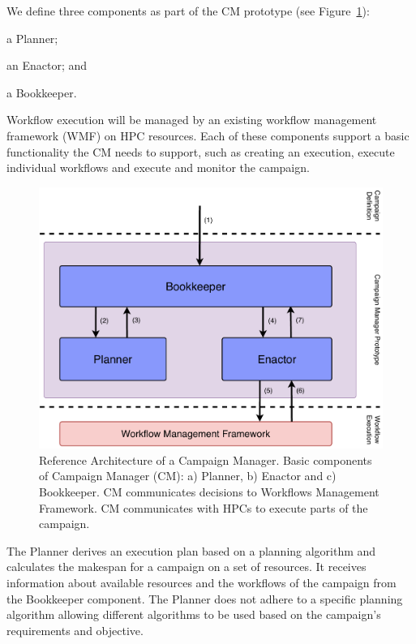 We define three components as part of the CM prototype (see 
Figure~\ref{fig:refarch}):
\begin{inparaenum}[(1)]
    \item a Planner;
    \item an Enactor; and
    \item a Bookkeeper. 
\end{inparaenum}
Workflow execution will be managed by an existing workflow management 
framework (WMF) on HPC resources. Each of these components support a basic 
functionality the CM needs to support, such as creating an 
execution, execute individual workflows and execute and monitor the campaign.

\begin{figure}[t]
    \centering
    \includegraphics[width=.75\textwidth]{figures/manager/CEM_design.pdf}
    \caption{Reference Architecture of a Campaign Manager. Basic 
        components of Campaign Manager (CM): a) Planner, b) Enactor and c) Bookkeeper. 
        CM communicates decisions to Workflows Management Framework. CM communicates with HPCs to 
        execute parts of the campaign.}\label{fig:refarch}
\end{figure}

The Planner derives an execution plan based on a planning algorithm and 
calculates the makespan for a campaign on a set of resources. It receives 
information about available resources and the workflows of the campaign from 
the Bookkeeper component. The Planner does not adhere to a specific planning 
algorithm allowing different algorithms to be used based on the campaign's 
requirements and objective.

